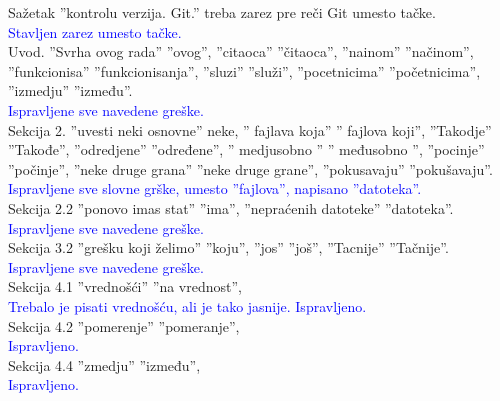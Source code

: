 \documentclass[a4paper]{report}
\newcommand{\odgovor}[1]{\textcolor{blue}{#1}}
\begin{document}
Sažetak  ''kontrolu verzija. Git.'' treba zarez pre reči Git umesto tačke.
\\
\odgovor{Stavljen zarez umesto tačke.}\\
Uvod. ''Svrha ovog rada'' ''ovog'', ''citaoca'' ''čitaoca'', ''nainom'' ''načinom'', ''funkcionisa'' ''funkcionisanja'', ''sluzi'' ''služi'', ''pocetnicima'' ''početnicima'', ''izmedju'' ''između''.
\\
\odgovor{Ispravljene sve navedene greške.}\\
Sekcija 2. ''uvesti neki osnovne'' neke, '' fajlava koja'' '' fajlova koji'', ''Takodje'' ''Takođe'', ''odredjene'' ''određene'', '' medjusobno '' '' međusobno '', ''pocinje'' ''počinje'', ''neke druge grana'' ''neke druge grane'', ''pokusavaju'' ''pokušavaju''.
\\
\odgovor{Ispravljene sve slovne grške, umesto ''fajlova'', napisano ''datoteka''.}\\
Sekcija 2.2 ''ponovo imas stat'' ''ima'', ''nepraćenih datoteke'' ''datoteka''.
\\
\odgovor{Ispravljene sve navedene greške.}\\
Sekcija 3.2 ''grešku koji želimo'' ''koju'', ''jos'' ''još'', ''Tacnije'' ''Tačnije''.
\\
\odgovor{Ispravljene sve navedene greške.}\\
Sekcija 4.1 ''vrednošći'' ''na vrednost'',
\\
\odgovor{Trebalo je pisati vrednošću, ali je tako jasnije. Ispravljeno.}\\
Sekcija 4.2  ''pomerenje''  ''pomeranje'',
\\
\odgovor{Ispravljeno.}\\
Sekcija 4.4 ''zmedju'' ''između'',\\
\odgovor{Ispravljeno.}\\
\end{document}
